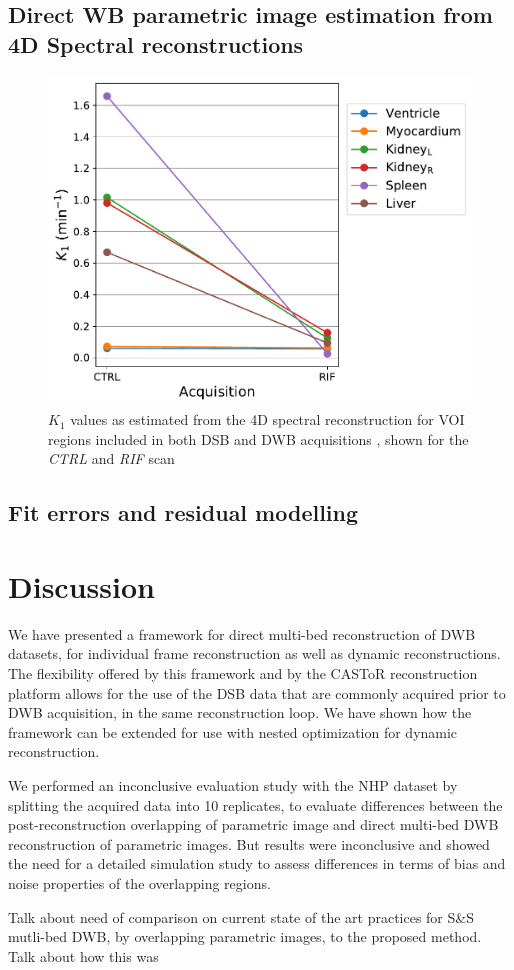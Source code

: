 \subsection{Direct WB parametric image estimation from 4D Spectral reconstructions}

\begin{figure} [h!]
\centering
\includegraphics[scale=0.5,angle=0]{3_Results/3_3_DWB_Reconstruction/figures/3_3_IsotoPK_K1_drop.pdf}
\caption{$K_1$ values as estimated from the 4D spectral reconstruction for VOI regions included in both DSB and DWB acquisitions , shown for the \textit{CTRL} and \textit{RIF} scan}
\label{fig_3_3:IsotoPK_K1_drop}
\end{figure} 


\subsection{Fit errors and residual modelling}


\newpage
\newpage
\newpage
\section{Discussion}

We have presented a framework for direct multi-bed reconstruction of DWB datasets, for individual frame reconstruction as well as dynamic reconstructions. The flexibility offered by this framework and by the CASToR reconstruction platform allows for the use of the DSB data that are commonly acquired prior to DWB acquisition, in the same reconstruction loop. We have shown how the framework can be extended for use with nested optimization for dynamic reconstruction.

We performed an inconclusive evaluation study with the NHP dataset by splitting the acquired data into 10 replicates, to evaluate differences between the post-reconstruction overlapping of parametric image and direct multi-bed DWB reconstruction of parametric images. But results were inconclusive and showed the need for a detailed simulation study to assess differences in terms of bias and noise properties of the overlapping regions. 

Talk about need of comparison on current state of the art practices for S\&S mutli-bed DWB, by overlapping parametric images, to the proposed method. Talk about how this was 
